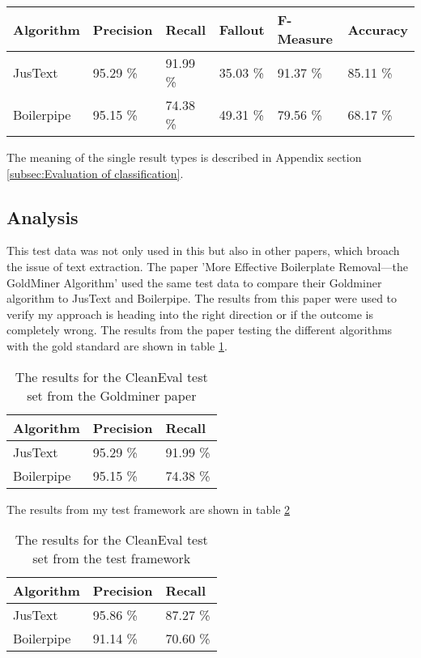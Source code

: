 \begin{tabular}{| p{2.2cm} | p{2.2cm} | p{2.2cm} | p{2.2cm} | p{2.2cm} | p{2.2cm} |}
    \hline
    \textbf{Algorithm}      & \textbf{Precision}  & \textbf{Recall}  & \textbf{Fallout}  & \textbf{F-Measure}  &\textbf{Accuracy} \\ \hline
    JusText     & 95.29 \%       &  91.99 \%  & 35.03 \% & 91.37 \% & 85.11 \%   \\ \hline
    Boilerpipe & 95.15 \%       &  74.38 \%  & 49.31 \% & 79.56 \% &  68.17 \% \\ \hline

\end{tabular}

The meaning of the single result types is described in Appendix section \ref{subsec:Evaluation of classification}.



\subsection{Analysis}

This test data was not only used in this but also in other papers, which broach the issue of text extraction. The paper 'More Effective Boilerplate Removal—the GoldMiner Algorithm' \cite{paper:goldminer} used the same test data to compare their Goldminer algorithm to JusText and Boilerpipe. The results from this paper were used to verify my approach is heading into the right direction or if the outcome is completely wrong. 
The results from the paper testing the different algorithms with the gold standard  are shown in table \ref{table:resultsGoldminer}.

\begin{table}[!ht]
\begin{tabular}{| p{3cm} | p{3cm} | p{3cm} | }
    \hline
    \textbf{Algorithm}      & \textbf{Precision}  & \textbf{Recall} 				\\ \hline
    JusText     & 95.29 \%       &  91.99 \%		\\ \hline
    Boilerpipe & 95.15 \%       &  74.38 \%		\\ \hline
\end{tabular}
\caption[asdfasdf]{The results for the CleanEval test set from the Goldminer paper}
\label{table:resultsGoldminer}
\end{table}

The results from my test framework are shown in table \ref{table:resultsComparison} 

\begin{table}[!ht]
\begin{tabular}{| p{3cm} | p{3cm} | p{3cm} | }
    \hline
    \textbf{Algorithm}      & \textbf{Precision}  & \textbf{Recall} 				\\ \hline
    JusText     & 95.86 \%       &  87.27 \%		\\ \hline
    Boilerpipe & 91.14 \%       &  70.60 \%		\\ \hline
\end{tabular}
\caption{The results for the CleanEval test set from the test framework}
\label{table:resultsComparison}
\end{table}


